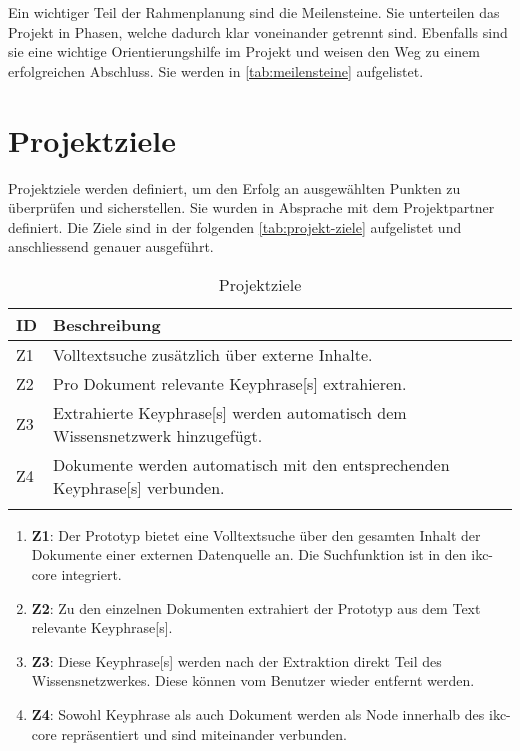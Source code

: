 Ein wichtiger Teil der Rahmenplanung sind die Meilensteine. Sie unterteilen das Projekt in Phasen, welche dadurch klar voneinander getrennt sind. Ebenfalls sind sie eine wichtige Orientierungshilfe im Projekt und weisen den Weg zu einem erfolgreichen Abschluss. Sie werden in \autoref{tab:meilensteine} aufgelistet.

\section{Projektziele} \label{projektziele}
Projektziele werden definiert, um den Erfolg an ausgewählten Punkten zu überprüfen und sicherstellen. Sie wurden in Absprache mit dem Projektpartner definiert. Die Ziele sind in der folgenden \autoref{tab:projekt-ziele} aufgelistet und anschliessend genauer ausgeführt.



\begin{longtable}{|p{1cm}  | p{10.5cm}|}
  \hline
    ID & Beschreibung \\\hline
    Z1 & Volltextsuche zusätzlich über externe Inhalte.\\\hline
    Z2 & Pro Dokument relevante \gls{Keyphrase}[s] extrahieren.\\\hline
    Z3 & Extrahierte \gls{Keyphrase}[s] werden automatisch dem Wissensnetzwerk hinzugefügt.\\\hline
    Z4 & Dokumente werden automatisch mit den entsprechenden \gls{Keyphrase}[s] verbunden.\\\hline
    \caption{Projektziele}
  \label{tab:projekt-ziele}
\end{longtable}

\begin{enumerate}
    \item \textbf{Z1}: Der Prototyp bietet eine Volltextsuche über den gesamten Inhalt der Dokumente einer externen Datenquelle an. Die Suchfunktion ist in den \gls{ikc-core} integriert.
    \item \textbf{Z2}: Zu den einzelnen Dokumenten extrahiert der Prototyp aus dem Text relevante \gls{Keyphrase}[s].
    \item \textbf{Z3}: Diese \gls{Keyphrase}[s] werden nach der Extraktion direkt Teil des Wissensnetzwerkes. Diese können vom Benutzer wieder entfernt werden.
    \item \textbf{Z4}: Sowohl \gls{Keyphrase} als auch Dokument werden als Node innerhalb des \gls{ikc-core} repräsentiert und sind miteinander verbunden. 
\end{enumerate}

